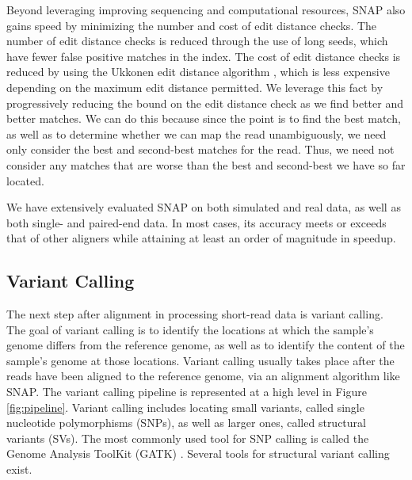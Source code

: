 \documentclass[twocolumn,10pt]{article}
\begin{document}
Beyond leveraging improving sequencing and computational resources, SNAP also gains speed by minimizing the number and cost of edit distance checks.  The number of edit distance checks is reduced through the use of long seeds, which have fewer false positive matches in the index.  The cost of edit distance checks is reduced by using the Ukkonen edit distance algorithm \cite{Ukkonen:1985}, which is less expensive depending on the maximum edit distance permitted.  We leverage this fact by progressively reducing the bound on the edit distance check as we find better and better matches.  We can do this because since the point is to find the best match, as well as to determine whether we can map the read unambiguously, we need only consider the best and second-best matches for the read.  Thus, we need not consider any matches that are worse than the best and second-best we have so far located.  

We have extensively evaluated SNAP on both simulated and real data, as well as both single- and paired-end data.  In most cases, its accuracy meets or exceeds that of other aligners while attaining at least an order of magnitude in speedup.

\subsection{Variant Calling}

The next step after alignment in processing short-read data is variant calling.  The goal of variant calling is to identify the locations at which the sample's genome differs from the reference genome, as well as to identify the content of the sample's genome at those locations.  Variant calling usually takes place after the reads have been aligned to the reference genome, via an alignment algorithm like SNAP.  The variant calling pipeline is represented at a high level in Figure \ref{fig:pipeline}.  Variant calling includes locating small variants, called single nucleotide polymorphisms (SNPs), as well as larger ones, called structural variants (SVs).  The most commonly used tool for SNP calling is called the Genome Analysis ToolKit (GATK) \cite{DePristo:2011}.  Several tools for structural variant calling exist.
\end{document}
